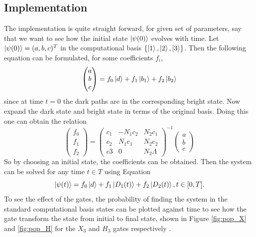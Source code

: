 \subsection{Implementation}
The implementation is quite straight forward, for given set of parameters, say that we want to see how the initial state $\ket{\psi(0)}$ evolves with time.
Let $\ket{\psi(0)} = (a,b,c)^T$ in the computational basis $\{\ket{1},\ket{2},\ket{3}\}$. Then the following equation can be formulated, for some coefficients $f_i$,
\begin{equation}
\begin{pmatrix}
a\\
b\\
c
\end{pmatrix}
= f_0 \ket{d} + f_1\ket{b_1} + f_2\ket{b_2}
\end{equation}
since at time $t = 0$ the dark paths are in the corresponding bright state.
Now expand the dark state and bright state in terms of the original basis. Doing this one can obtain the relation
\begin{equation}
\begin{pmatrix}
f_0\\
f_1\\
f_2
\end{pmatrix} = \begin{pmatrix}
c_1 & -N_1 c_2 & N_2 c_1
\\
c_2 & N_1 c_1 & N_2 c_2
\\
c3 & 0 & N_2 \Lambda
\end{pmatrix}^{-1}\begin{pmatrix}
a\\
b\\
c
\end{pmatrix}
\end{equation}
So by choosing an initial state, the coefficients can be obtained.
Then the system can be solved for any time $t \in T$ using Equation 
\begin{equation}
\label{eq:expl-time}
\ket{\psi(t)} = f_0\ket{d} + f_1\ket{D_1(t)} + f_2\ket{D_2(t)}, t \in [0,T].
\end{equation}
To see the effect of the gates, the probability of finding the system in the standard computational basis states can be plotted against time to see how the gate transform the state from initial to final state, shown in Figure \ref{fig:pop_X} and \ref{fig:pop_H} for the $X_3$ and $H_3$ gates respectively . 
